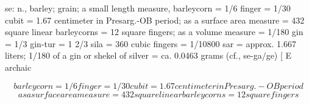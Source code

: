 
\begin{tzpsnapshot}
\end{tzpsnapshot}

se: n., barley; grain; a small length measure, barleycorn = 1/6 finger = 1/30 cubit = 1.67 centimeter in Presarg.-OB period; as a surface area measure = 432 square linear barleycorns = 12 square fingers; as a volume measure = 1/180 gin = 1/3 gin-tur = 1 2/3 sila = 360 cubic fingers = 1/10800 sar = approx. 1.667 liters; 1/180 of a gin or shekel of silver = ca. 0.0463 grams (cf., se-ga/ge) [ E archaic

\[
barleycorn = 1/6 finger = 1/30 cubit = 1.67 centimeter in Presarg.-OB period
\]
\[
as a surface area measure = 432 square linear barleycorns = 12 square fingers
\]

